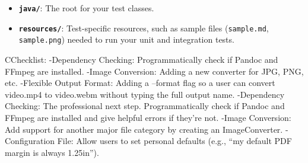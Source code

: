 \begin{itemize}
  \begin{itemize}
  \tightlist
  \item
    \textbf{\texttt{java/}}: The root for your test classes.
  \item
    \textbf{\texttt{resources/}}: Test-specific resources, such as
    sample files (\texttt{sample.md}, \texttt{sample.png}) needed to run
    your unit and integration tests.
  \end{itemize}
\end{itemize}

CChecklist: -Dependency Checking: Programmatically check if Pandoc and
FFmpeg are installed. -Image Conversion: Adding a new converter for JPG,
PNG, etc. -Flexible Output Format: Adding a --format flag so a user can
convert video.mp4 to video.webm without typing the full output name.
-Dependency Checking: The professional next step. Programmatically check
if Pandoc and FFmpeg are installed and give helpful errors if they're
not. -Image Conversion: Add support for another major file category by
creating an ImageConverter. -Configuration File: Allow users to set
personal defaults (e.g., ``my default PDF margin is always 1.25in'').
